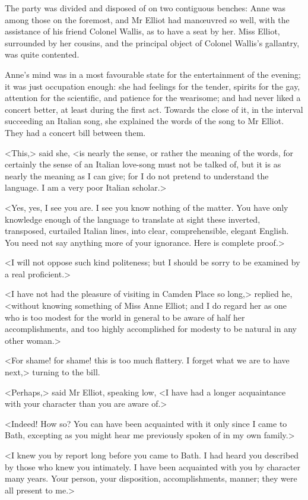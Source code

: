 The party was divided and disposed of on two contiguous benches: Anne was among those on the foremost, and Mr Elliot had manœuvred so well, with the assistance of his friend Colonel Wallis, as to have a seat by her. Miss Elliot, surrounded by her cousins, and the principal object of Colonel Wallis's gallantry, was quite contented.

Anne's mind was in a most favourable state for the entertainment of the evening; it was just occupation enough: she had feelings for the tender, spirits for the gay, attention for the scientific, and patience for the wearisome; and had never liked a concert better, at least during the first act. Towards the close of it, in the interval succeeding an Italian song, she explained the words of the song to Mr Elliot. They had a concert bill between them.

<This,> said she, <is nearly the sense, or rather the meaning of the words, for certainly the sense of an Italian love-song must not be talked of, but it is as nearly the meaning as I can give; for I do not pretend to understand the language. I am a very poor Italian scholar.>

<Yes, yes, I see you are. I see you know nothing of the matter. You have only knowledge enough of the language to translate at sight these inverted, transposed, curtailed Italian lines, into clear, comprehensible, elegant English. You need not say anything more of your ignorance. Here is complete proof.>

<I will not oppose such kind politeness; but I should be sorry to be examined by a real proficient.>

<I have not had the pleasure of visiting in Camden Place so long,> replied he, <without knowing something of Miss Anne Elliot; and I do regard her as one who is too modest for the world in general to be aware of half her accomplishments, and too highly accomplished for modesty to be natural in any other woman.>

<For shame! for shame! this is too much flattery. I forget what we are to have next,> turning to the bill.

<Perhaps,> said Mr Elliot, speaking low, <I have had a longer acquaintance with your character than you are aware of.>

<Indeed! How so? You can have been acquainted with it only since I came to Bath, excepting as you might hear me previously spoken of in my own family.>

<I knew you by report long before you came to Bath. I had heard you described by those who knew you intimately. I have been acquainted with you by character many years. Your person, your disposition, accomplishments, manner; they were all present to me.>

